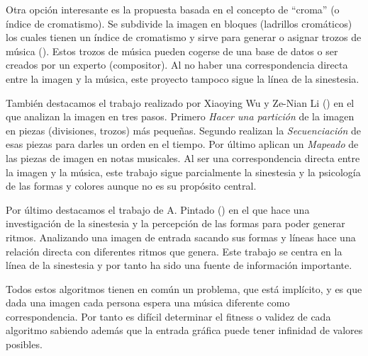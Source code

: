 Otra opción interesante es la propuesta basada en el concepto de ``croma'' (o índice de cromatismo). Se subdivide la imagen en bloques (ladrillos cromáticos) los cuales tienen un índice de cromatismo y sirve para generar o asignar trozos de música (\cite{bricksConvertsMusic}). Estos trozos de música pueden cogerse de una base de datos o ser creados por un experto (compositor). \color{blue} Al no haber una correspondencia directa entre la imagen y la música, este proyecto tampoco sigue la línea de la sinestesia.\\ \color{black}

También destacamos el trabajo realizado por Xiaoying Wu y Ze-Nian Li (\cite{ImageBaseComposition}) en el que analizan la imagen en tres pasos. Primero \emph{Hacer una partición} de la imagen en piezas (divisiones, trozos) más pequeñas. Segundo realizan la \emph{Secuenciación} de esas piezas para darles un orden en el tiempo. Por último aplican un \emph{Mapeado} de las piezas de imagen en notas musicales. \color{blue} Al ser una correspondencia directa entre la imagen y la música, este trabajo sigue parcialmente la sinestesia y la psicología de las formas y colores aunque no es su propósito central.\\ \color{black}

\color{blue}
Por último destacamos el trabajo de A. Pintado (\cite{portutesis}) en el que hace una investigación de la sinestesia y la percepción de las formas para poder generar ritmos. Analizando una imagen de entrada sacando sus formas y líneas hace una relación directa con diferentes ritmos que genera. Este trabajo se centra en la línea de la sinestesia y por tanto ha sido una fuente de información importante. \color{black}

Todos estos algoritmos tienen en común un problema, que está implícito, y es que dada una imagen cada persona espera una música diferente como correspondencia. Por tanto es difícil determinar el fitness o validez de cada algoritmo sabiendo además que la entrada gráfica puede tener infinidad de valores posibles.


